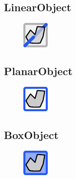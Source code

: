 \documentclass{ol-softwaremanual}
\begin{document}
\subsection{LinearObject}
\begin{figure}[h]
    \centering
    \includegraphics[width = .5\textwidth]{figures/Icons/LINEAROBJECT.pdf}
\end{figure}

\subsection{PlanarObject}
\begin{figure}[h]
    \centering
    \includegraphics[width = .5\textwidth]{figures/Icons/PLANAROBJECT.pdf}
\end{figure}

\subsection{BoxObject}
\begin{figure}[h]
    \centering
    \includegraphics[width = .5\textwidth]{figures/Icons/BOXOBJECT.pdf}
\end{figure}
\end{document}
